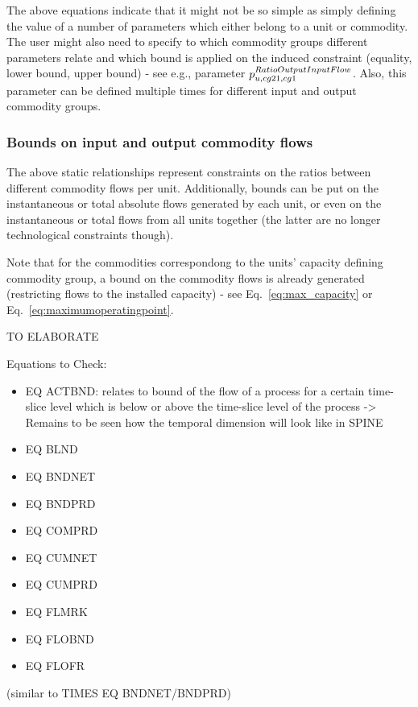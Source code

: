 {\color{red}
The above equations indicate that it might not be so simple as simply defining the value of a number of parameters which either belong to a unit or commodity. The user might also need to specify to which commodity groups different parameters relate and which bound is applied on the induced constraint (equality, lower bound, upper bound) - see e.g., parameter $p^{RatioOutputInputFlow}_{u,cg21,cg1}$. Also, this parameter can be defined multiple times for different input and output commodity groups. 
}

\subsubsection{Bounds on input and output commodity flows}


The above static relationships represent constraints on the ratios between different commodity flows per unit. Additionally, bounds can be put on the instantaneous or total absolute flows generated by each unit, or even on the instantaneous or total flows from all units together (the latter are no longer technological constraints though).

Note that for the commodities correspondong to the units' capacity defining commodity group, a bound on the commodity flows is already generated (restricting flows to the installed capacity) - see Eq.~\eqref{eq:max_capacity} or Eq.~\eqref{eq:maximumoperatingpoint}.

{\color{red} TO ELABORATE

Equations to Check:
\begin{itemize}
	\item EQ ACTBND: relates to bound of the flow of a process for a certain time-slice level which is below or above the time-slice level of the process -> Remains to be seen how the temporal dimension will look like in SPINE
	\item EQ BLND
	\item EQ BNDNET
	\item EQ BNDPRD
	\item EQ COMPRD
	\item EQ CUMNET
	\item EQ CUMPRD
	\item EQ FLMRK
	\item EQ FLOBND
	\item EQ FLOFR
\end{itemize}
}


(similar to TIMES EQ BNDNET/BNDPRD)





